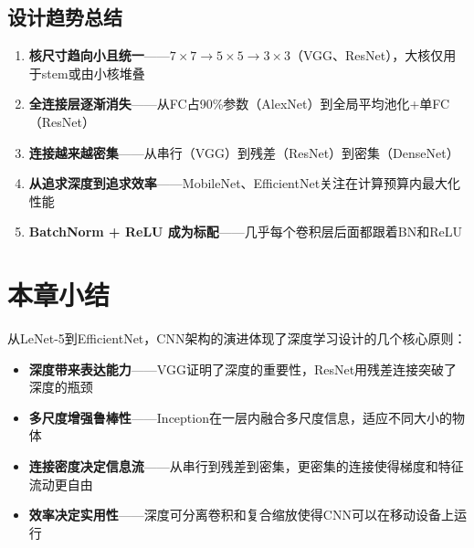 \subsection{设计趋势总结}

\begin{enumerate}
    \item \textbf{核尺寸趋向小且统一}——$7\times7 \to 5\times5 \to 3\times3$（VGG、ResNet），大核仅用于stem或由小核堆叠
    \item \textbf{全连接层逐渐消失}——从FC占90\%参数（AlexNet）到全局平均池化+单FC（ResNet）
    \item \textbf{连接越来越密集}——从串行（VGG）到残差（ResNet）到密集（DenseNet）
    \item \textbf{从追求深度到追求效率}——MobileNet、EfficientNet关注在计算预算内最大化性能
    \item \textbf{BatchNorm + ReLU 成为标配}——几乎每个卷积层后面都跟着BN和ReLU
\end{enumerate}

\section{本章小结}

从LeNet-5到EfficientNet，CNN架构的演进体现了深度学习设计的几个核心原则：
\begin{itemize}
    \item \textbf{深度带来表达能力}——VGG证明了深度的重要性，ResNet用残差连接突破了深度的瓶颈
    \item \textbf{多尺度增强鲁棒性}——Inception在一层内融合多尺度信息，适应不同大小的物体
    \item \textbf{连接密度决定信息流}——从串行到残差到密集，更密集的连接使得梯度和特征流动更自由
    \item \textbf{效率决定实用性}——深度可分离卷积和复合缩放使得CNN可以在移动设备上运行
\end{itemize}
